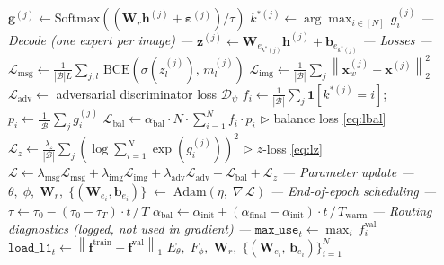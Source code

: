 ﻿\documentclass[12pt, a4paper, twoside]{report}
\numberwithin{equation}{chapter}
\begin{document}
\begin{algorithm}[H]
\begin{algorithmic}[1]
        \State $\mathbf{g}^{(j)} \leftarrow \mathrm{Softmax}\!\left(\left(\mathbf{W}_r\mathbf{h}^{(j)}+\boldsymbol{\varepsilon}^{(j)}\right)/\tau\right)$ 
        \State $k^{*(j)} \leftarrow \arg\max_{i\in[N]}\,g_i^{(j)}$ 
        \Statex \hspace{2.5em}\textit{--- Decode (one expert per image) ---}
        \State $\mathbf{z}^{(j)} \leftarrow \mathbf{W}_{e_{k^*(j)}}\mathbf{h}^{(j)} + \mathbf{b}_{e_{k^*(j)}}$
        \Statex \hspace{2.5em}\textit{--- Losses ---}
        \State $\mathcal{L}_\mathrm{msg} \leftarrow \frac{1}{|\mathcal{B}|L}\sum_{j,l}\,\mathrm{BCE}\!\left(\sigma(z_l^{(j)}),\, m_l^{(j)}\right)$
        \State $\mathcal{L}_\mathrm{img} \leftarrow \frac{1}{|\mathcal{B}|}\sum_{j}\left\|\mathbf{x}_w^{(j)}-\mathbf{x}^{(j)}\right\|_2^2$
        \State $\mathcal{L}_\mathrm{adv} \leftarrow$ adversarial discriminator loss $\mathcal{D}_\psi$ 
        \State $f_i \leftarrow \frac{1}{|\mathcal{B}|}\sum_{j}\mathbf{1}[k^{*(j)}=i]$;\quad $p_i \leftarrow \frac{1}{|\mathcal{B}|}\sum_{j}g_i^{(j)}$ 
        \State $\mathcal{L}_\mathrm{bal} \leftarrow \alpha_\mathrm{bal}\cdot N\cdot\sum_{i=1}^{N} f_i \cdot p_i$ \hfill $\triangleright$ balance loss \eqref{eq:lbal}
        \State $\mathcal{L}_z \leftarrow \frac{\lambda_z}{|\mathcal{B}|}\sum_{j}\!\left(\log\sum_{i=1}^{N}\exp(g_i^{(j)})\right)^{\!2}$ \hfill $\triangleright$ $z$-loss \eqref{eq:lz}
        \State $\mathcal{L} \leftarrow \lambda_\mathrm{msg}\mathcal{L}_\mathrm{msg} + \lambda_\mathrm{img}\mathcal{L}_\mathrm{img} + \lambda_\mathrm{adv}\mathcal{L}_\mathrm{adv} + \mathcal{L}_\mathrm{bal} + \mathcal{L}_z$
        \Statex \hspace{2.5em}\textit{--- Parameter update ---}
        \State $\theta,\;\phi,\;\mathbf{W}_r,\;\{(\mathbf{W}_{e_i},\mathbf{b}_{e_i})\} \;\leftarrow\; \mathrm{Adam}\!\left(\eta,\;\nabla\,\mathcal{L}\right)$
    \EndFor
    \Statex \hspace{1.5em}\textit{--- End-of-epoch scheduling ---}
    \State $\tau \leftarrow \tau_0 - (\tau_0 - \tau_T)\cdot t\,/\,T$ 
        \State $\alpha_\mathrm{bal} \leftarrow \alpha_\mathrm{init} + (\alpha_\mathrm{final}-\alpha_\mathrm{init})\cdot t\,/\,T_\mathrm{warm}$ 
    \EndIf
    \Statex \hspace{1.5em}\textit{--- Routing diagnostics (logged, not used in gradient) ---}
    \State $\texttt{max\_use}_t \leftarrow \max_{i}\,f_i^{\mathrm{val}}$ 
    \State $\texttt{load\_l1}_t \leftarrow \left\|\mathbf{f}^{\mathrm{train}} - \mathbf{f}^{\mathrm{val}}\right\|_1$ 
\EndFor
\State \Return $E_\theta,\; F_\phi,\; \mathbf{W}_r,\; \bigl\{(\mathbf{W}_{e_i},\,\mathbf{b}_{e_i})\bigr\}_{i=1}^N$
\EndProcedure
\end{algorithmic}
\end{algorithm}
\end{document}
